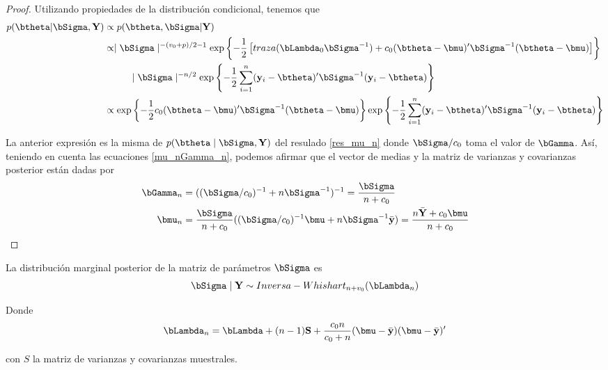 \begin{proof}
Utilizando propiedades de la distribución condicional, tenemos que
\begin{align*}
p(\btheta|\bSigma,\mathbf{Y})&\propto p(\btheta, \bSigma|\mathbf{Y})\\
&\propto \mid \bSigma \mid ^{-(v_0+p)/2-1}
\exp\left\{ -\frac{1}{2}\left[traza(\bLambda_0\bSigma^{-1})+
c_0(\btheta-\bmu)'\bSigma^{-1}(\btheta-\bmu)\right]\right\}\\
&\ \ \ \ \ \ \ \ \mid \bSigma \mid ^{-n/2}\exp\left\{-\frac{1}{2}\sum_{i=1}^n(\mathbf{y}_i-\btheta)'\bSigma^{-1}(\mathbf{y}_i-\btheta)\right\}\\
&\propto \exp\left\{ -\frac{1}{2}
c_0(\btheta-\bmu)'\bSigma^{-1}(\btheta-\bmu)\right\}\exp\left\{-\frac{1}{2}\sum_{i=1}^n(\mathbf{y}_i-\btheta)'\bSigma^{-1}(\mathbf{y}_i-\btheta)\right\}
\end{align*}

La anterior expresión es la misma de $p(\btheta\mid\bSigma,\mathbf{Y})$ del resulado \ref{res_mu_n} donde $\bSigma/c_0$ toma el valor de $\bGamma$. Así, teniendo en cuenta las ecuaciones \ref{mu_nGamma_n}, podemos afirmar que el vector de medias y la matriz de varianzas y covarianzas posterior están dadas por
\begin{align}
\bGamma_n&=((\bSigma/c_0)^{-1}+n\bSigma^{-1})^{-1}=\frac{\bSigma}{n+c_0}\\
\bmu_n&=\frac{\bSigma}{n+c_0}((\bSigma/c_0)^{-1}\bmu+n\bSigma^{-1}\bar{\mathbf{y}})=\frac{n\bar{\mathbf{Y}}+c_0\bmu}{n+c_0}
\end{align}
\end{proof}
                              
\begin{Res}\label{Pos_Sigma}
La distribución marginal posterior de la matriz de parámetros $\bSigma$ es
\begin{equation*}
\bSigma \mid \mathbf{Y} \sim Inversa-Whishart_{n+v_0}(\bLambda_n)
\end{equation*}

Donde
\begin{equation}\label{bLambda_n}
\bLambda_n=\bLambda+(n-1)\mathbf{S}+\frac{c_0n}{c_0+n}(\bmu-\bar{\mathbf{y}})(\bmu-\bar{\mathbf{y}})'
\end{equation}

con $S$ la matriz de varianzas y covarianzas muestrales.
\end{Res}

